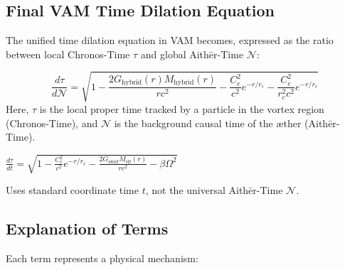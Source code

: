\subsection{Final VAM Time Dilation Equation}
The unified time dilation equation in VAM becomes, expressed as the ratio between local Chronos-Time $\tau$ and global Aithēr-Time $\mathcal{N}$:

\begin{equation}
\boxed{
\frac{d\tau}{d\mathcal{N}} = \sqrt{
1
- \frac{2 G_{\text{hybrid}}(r) M_{\text{hybrid}}(r)}{r c^2}
- \frac{C_e^2}{c^2} e^{-r/r_c}
- \frac{C_e^2}{r_c^2 c^2} e^{-r/r_c}
}}
\label{eq:final_vam_td}
\end{equation}
Here, $\tau$ is the local proper time tracked by a particle in the vortex region (Chronos-Time), and $\mathcal{N}$ is the background causal time of the æther (Aithēr-Time).

$\frac{d\tau}{dt} = \sqrt{
1
- \frac{C_e^2}{c^2} e^{-r/r_c}
- \frac{2G_\text{swirl} M_\text{eff}(r)}{r c^2}
- \beta \Omega^2
}$

Uses standard coordinate time $t$, not the universal Aithēr-Time $\mathcal{N}$.

\subsection{Explanation of Terms}

Each term represents a physical mechanism:

